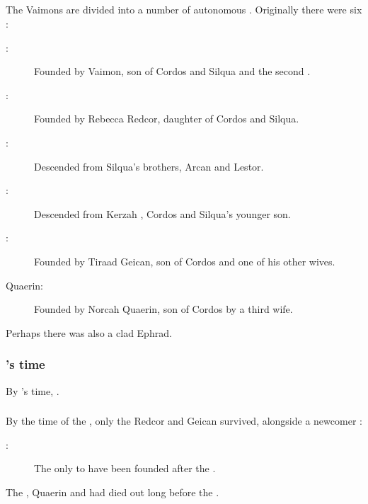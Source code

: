 \subsection{\VClans}

The Vaimons are divided into a number of autonomous \quo{\vclans}. 
Originally there were six \vclans: 

\begin{description}
  \item[{\Zether}:] 
    Founded by \Zether Vaimon, son of Cordos and Silqua and the second \VaimonCaliph.
  \item[:] 
    Founded by Rebecca Redcor, daughter of Cordos and Silqua.
  \item[{\Delaen}:] 
    Descended from Silqua's brothers, Arcan and Lestor.
  \item[{\Irgel}:] 
    Descended from Kerzah \Irgel, Cordos and Silqua's younger son.
  \item[:] 
    Founded by Tiraad Geican, son of Cordos and one of his other wives.
  \item[{Quaerin}:] 
    Founded by Norcah Quaerin, son of Cordos by a third wife.
\end{description}

Perhaps there was also a clad Ephrad.





\subsubsection{\Belzir's time}
By \Belzir's time, .





\subsubsection{\Thirdbanewar}
By the time of the \thirdbanewar, only the \vclans Redcor and Geican survived, alongside a newcomer \vclan:

\begin{description}
  \item[:] 
    The only \vclan to have been founded after the
 . 
\end{description}

The \vclans \Delaen, Quaerin and \Zether had died out long before the \thirdbanewar. 

